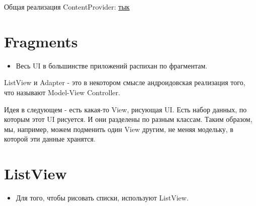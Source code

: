 \documentclass[12 pt]{article}
\begin{document}
    Общая реализация ContentProvider: \href{https://github.com/krinkinmu/forecast/blob/master/app/src/main/java/edu/spbau/android/forecast/WeatherProvider.java}{тык}
\section{Fragments}
    \begin{itemize}
        \item Весь UI в большинстве приложений распихан по фрагментам.
    \end{itemize}   
    ListView и Adapter - это в некотором смысле андроидовская реализация того, что называют Model-View Controller.
    
    Идея в следующем - есть какая-то View, рисующая UI. Есть набор данных, по которым этот UI рисуется. И они разделены по разным классам. Таким образом, мы, например, можем подменить один View другим, не меняя модельку, в которой эти данные хранятся.
\section{ListView}
    \begin{itemize}
        \item Для того, чтобы рисовать списки, используют ListView.
    \end{itemize}
\end{document}
